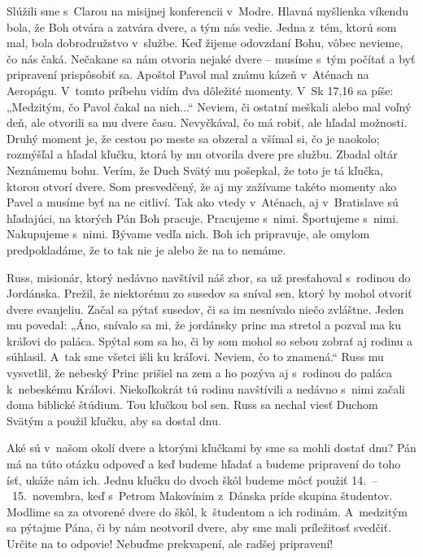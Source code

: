 


Slúžili sme s~Clarou na misijnej konferencii v~Modre.  Hlavná myšlienka víkendu bola, že Boh otvára a zatvára dvere, a tým nás vedie. Jedna z~tém, ktorú som mal, bola dobrodružstvo v~službe. Keď žijeme odovzdaní Bohu, vôbec nevieme, čo nás čaká. Nečakane sa nám otvoria nejaké dvere -- musíme s~tým počítať a byť pripravení prispôsobiť sa. Apoštol Pavol mal známu kázeň v~Aténach na Aeropágu. V~tomto príbehu vidím dva dôležité momenty. V~Sk 17,16 sa píše: „Medzitým, čo Pavol čakal na nich...“ Neviem, či ostatní meškali alebo mal voľný deň, ale otvorili sa mu dvere času. Nevyčkával, čo má robiť, ale hľadal možnosti. Druhý moment je, že cestou po meste sa obzeral a všímal si, čo je naokolo; rozmýšľal a hľadal kľučku, ktorá by mu otvorila dvere pre službu. Zbadal oltár Neznámemu bohu. Verím, že Duch Svätý mu pošepkal, že toto je tá kľučka, ktorou otvorí dvere. Som presvedčený, že aj my zažívame takéto momenty ako Pavel a musíme byť na ne citliví. Tak ako vtedy v~Aténach, aj v~Bratislave sú hľadajúci, na ktorých Pán Boh pracuje. Pracujeme s~nimi. Športujeme s~nimi. Nakupujeme s~nimi. Bývame vedľa nich. Boh ich pripravuje, ale omylom predpokladáme, že to tak nie je alebo že na to nemáme.

Russ, misionár, ktorý nedávno navštívil náš zbor, sa už presťahoval s~rodinou do Jordánska. Prežil, že niektorému zo susedov sa sníval sen, ktorý by mohol otvoriť dvere evanjeliu. Začal sa pýtať susedov, či sa im nesnívalo niečo zvláštne. Jeden mu povedal: „Áno, snívalo sa mi, že jordánsky princ ma stretol a pozval ma ku kráľovi do paláca. Spýtal som sa ho, či by som mohol so sebou zobrať aj rodinu a súhlasil. A~tak sme všetci išli ku kráľovi. Neviem, čo to znamená.“ Russ mu vysvetlil, že nebeský Princ prišiel na zem a ho pozýva aj s~rodinou do paláca k~nebeskému Kráľovi. Niekoľkokrát tú rodinu navštívili a nedávno s~nimi začali doma biblické štúdium. Tou kľučkou bol sen. Russ sa nechal viesť Duchom Svätým a použil kľučku, aby sa dostal dnu.

Aké sú v~našom okolí dvere a ktorými kľučkami by sme sa mohli dostať dnu? Pán má na túto otázku odpoveď a keď budeme hľadať a budeme pripravení do toho ísť, ukáže nám ich. Jednu kľučku do dvoch škôl budeme môcť použiť 14.~--~15.~novembra, keď s~Petrom Makovínim z~Dánska príde skupina študentov. Modlime sa za otvorené dvere do škôl, k~študentom a ich rodinám. A~medzitým sa pýtajme Pána, či by nám neotvoril dvere, aby sme mali príležitosť svedčiť. Určite na to odpovie! Nebuďme prekvapení, ale radšej pripravení!

